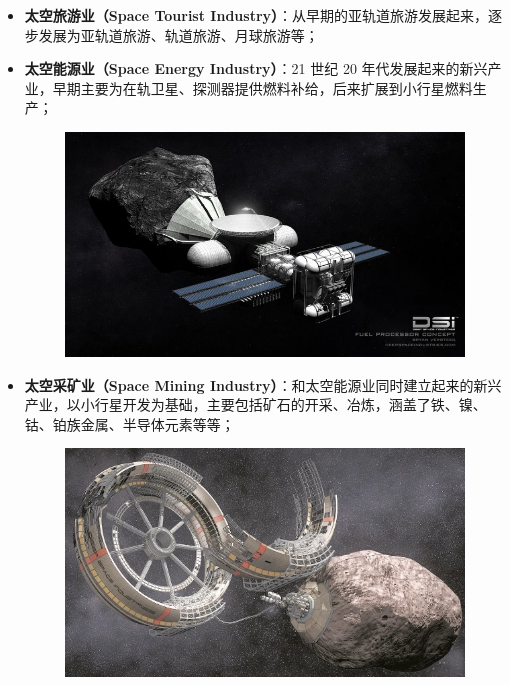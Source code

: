 \documentclass[letterpaper,10pt]{sphinxmanual}
\begin{document}
\begin{itemize}
\item {} 
\textbf{太空旅游业（Space Tourist Industry）}：从早期的亚轨道旅游发展起来，逐步发展为亚轨道旅游、轨道旅游、月球旅游等；

\end{itemize}

\begin{itemize}
\item {} 
\textbf{太空能源业（Space Energy Industry）}：21 世纪 20 年代发展起来的新兴产业，早期主要为在轨卫星、探测器提供燃料补给，后来扩展到小行星燃料生产；
\begin{figure}[htbp]
\centering

\includegraphics{DSI-FuelProcessor_BV-20-01-13.jpg}
\end{figure}

\end{itemize}

\begin{itemize}
\item {} 
\textbf{太空采矿业（Space Mining Industry）}：和太空能源业同时建立起来的新兴产业，以小行星开发为基础，主要包括矿石的开采、冶炼，涵盖了铁、镍、钴、铂族金属、半导体元素等等；
\begin{figure}[htbp]
\centering

\includegraphics{DSI-settlement-concept_BV-21-01-13.jpg}
\end{figure}

\end{itemize}
\end{document}
